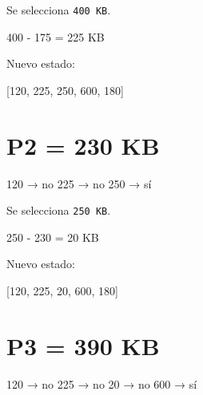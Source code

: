 \documentclass[
  spanish,
  letterpaper,
]{scrbook}
\newenvironment{Shaded}{\begin{snugshade}}{\end{snugshade}}
\newcommand{\NormalTok}[1]{\textcolor[rgb]{0.00,0.23,0.31}{#1}}
\begin{document}
Se selecciona \texttt{400\ KB}.

\begin{Shaded}
\begin{Highlighting}[]
\NormalTok{400 {-} 175 = 225 KB}
\end{Highlighting}
\end{Shaded}

Nuevo estado:

\begin{Shaded}
\begin{Highlighting}[]
\NormalTok{[120, 225, 250, 600, 180]}
\end{Highlighting}
\end{Shaded}

\section{P2 = 230 KB}\label{p2-230-kb}

\begin{Shaded}
\begin{Highlighting}[]
\NormalTok{120 → no}
\NormalTok{225 → no}
\NormalTok{250 → sí}
\end{Highlighting}
\end{Shaded}

Se selecciona \texttt{250\ KB}.

\begin{Shaded}
\begin{Highlighting}[]
\NormalTok{250 {-} 230 = 20 KB}
\end{Highlighting}
\end{Shaded}

Nuevo estado:

\begin{Shaded}
\begin{Highlighting}[]
\NormalTok{[120, 225, 20, 600, 180]}
\end{Highlighting}
\end{Shaded}

\section{P3 = 390 KB}\label{p3-390-kb}

\begin{Shaded}
\begin{Highlighting}[]
\NormalTok{120 → no}
\NormalTok{225 → no}
\NormalTok{20  → no}
\NormalTok{600 → sí}
\end{Highlighting}
\end{Shaded}
\end{document}
